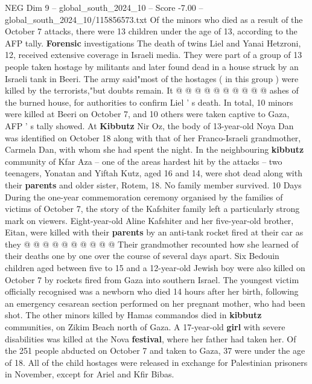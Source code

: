 \begin{textsample}{NEG Dim 9 – global\_south\_2024\_10 – Score -7.00 – global\_south\_2024\_10/115856573.txt}
Of the minors who died as a result of the October 7 attacks, there were 13 children under the age of 13, according to the AFP tally. \textbf{Forensic} investigations The death of twins Liel and Yanai Hetzroni, 12, received extensive coverage in Israeli media.
They were part of a group of 13 people taken hostage by militants and later found dead in a house struck by an Israeli tank in Beeri.
The army said"most of the hostages ( in this group ) were killed by the terrorists,"but doubts remain.
It @ @ @ @ @ @ @ @ @ @ ashes of the burned house, for authorities to confirm Liel ' s death.
In total, 10 minors were killed at Beeri on October 7, and 10 others were taken captive to Gaza, AFP ' s tally showed.
At \textbf{Kibbutz} Nir Oz, the body of 13-year-old Noya Dan was identified on October 18 along with that of her Franco-Israeli grandmother, Carmela Dan, with whom she had spent the night.
In the neighbouring \textbf{kibbutz} community of Kfar Aza -- one of the areas hardest hit by the attacks -- two teenagers, Yonatan and Yiftah Kutz, aged 16 and 14, were shot dead along with their \textbf{parents} and older sister, Rotem, 18.
No family member survived. 10 Days During the one-year commemoration ceremony organised by the families of victims of October 7, the story of the Kafshiter family left a particularly strong mark on viewers.
Eight-year-old Aline Kafshiter and her five-year-old brother, Eitan, were killed with their \textbf{parents} by an anti-tank rocket fired at their car as they @ @ @ @ @ @ @ @ @ @ Their grandmother recounted how she learned of their deaths one by one over the course of several days apart.
Six Bedouin children aged between five to 15 and a 12-year-old Jewish boy were also killed on October 7 by rockets fired from Gaza into southern Israel.
The youngest victim officially recognised was a newborn who died 14 hours after her birth, following an emergency cesarean section performed on her pregnant mother, who had been shot.
The other minors killed by Hamas commandos died in \textbf{kibbutz} communities, on Zikim Beach north of Gaza.
A 17-year-old \textbf{girl} with severe disabilities was killed at the Nova \textbf{festival}, where her father had taken her.
Of the 251 people abducted on October 7 and taken to Gaza, 37 were under the age of 18.
All of the child hostages were released in exchange for Palestinian prisoners in November, except for Ariel and Kfir Bibas.

\end{textsample}
